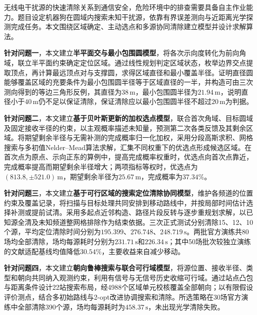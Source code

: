 无线电干扰源的快速清除关系到通信安全，危险环境中的排查需要具备自主作业能力。题目设定机器狗在圆域内搜索未知干扰源，依靠有界误差测向与近距离光学探测完成任务。本文围绕区域确定、主动选点和多源协同清除建立模型并设计求解算法。

\textbf{针对问题一}，本文建立\textbf{半平面交与最小包围圆模型}，将各次示向度转化为前向角域，联立半平面约束确定定位区域。通过线性规划判定区域状态，枚举边界交点提取顶点，再计算最远顶点对与支撑圆，求得区域直径和最小覆盖半径。证明直径圆能够覆盖区域的充要条件为最小包围圆半径等于区域直径的一半，并构造可由三次测向得到的等边三角形反例，其直径为\(38\,\mathrm{m}\)，最小包围圆半径为\(21.94\,\mathrm{m}\)，说明直径小于\(40\,\mathrm{m}\)仍不足以保证清除，保证清除应以最小包围圆半径不超过\(20\,\mathrm{m}\)为判据。

\textbf{针对问题二}，本文建立\textbf{基于贝叶斯更新的加权选点模型}，联合首次角域、目标圆域及固定接收半径的约束，以主观概率描述未知量，预测第二次各类反馈及其剩余区域。将期望剩余半径与无需补测的完成概率归一化加权，采用分段高斯求积、网格搜索与多初值Nelder--Mead算法求解，汇集不同权重下的优选点形成候选区域。在首次点为原点、示向正东的算例中，提高完成概率权重时，优选点向首次点靠近，完成概率提高而期望剩余半径增大；两项指标等权时，优选点为\((813.8,\pm521.0)\,\mathrm{m}\)，期望剩余半径为\(25.67\,\mathrm{m}\)，完成概率为\(37.34\%\)。

\textbf{针对问题三}，本文建立\textbf{基于可行区域的搜索定位清除协同模型}，维护各频道的位置约束及覆盖记录，将扫描与目标处理共同安排到移动路线中，并按局部时间估计选择补测或提前试清。采用多起点近邻构造、路径片段反转与逐步重规划求解，以已知源全清及未知频道整网格排除作为结束依据。三次正式测试分别清除15、12、10个源，平均定位清除时间分别为\(195.399\)、\(276.748\)、\(248.719\,\mathrm{s}\)。两批官方演练共80场均全部清除，场均每源耗时分别为\(231.71\,\mathrm{s}\)和\(226.34\,\mathrm{s}\)；其中50场批次较独立演练的文献适配基线均值降低\(30.54\%\)，主要收益来自减少移动。

\textbf{针对问题四}，本文建立\textbf{朝向鲁棒搜索与联合可行域模型}，将源位置、接收半径、类型和朝向共同纳入观测约束，利用有信号与无信号历史收缩可行域。通过站点凸包与距离条件设计22站搜索布局，经4988个区域单元校核覆盖全部朝向；以有限假设评价测点，结合多初始路线与2-opt改进协调搜索和清除。所选策略在30场官方演练中全部清除390个源，场均每源耗时为\(458.37\,\mathrm{s}\)，未出现光学清除失败。
